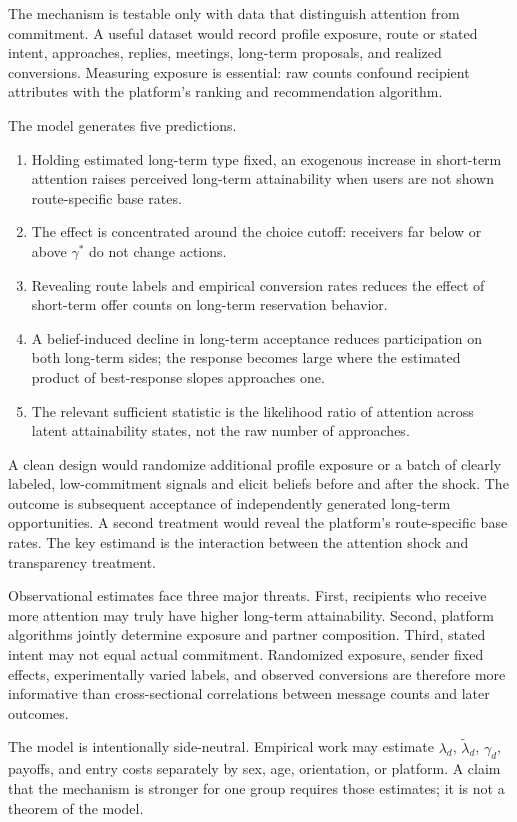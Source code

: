 \documentclass[11pt]{article}
\begin{document}
The mechanism is testable only with data that distinguish attention from
commitment. A useful dataset would record profile exposure, route or stated
intent, approaches, replies, meetings, long-term proposals, and realized
conversions. Measuring exposure is essential: raw counts confound recipient
attributes with the platform's ranking and recommendation algorithm.

The model generates five predictions.
\begin{enumerate}[leftmargin=*]
\item Holding estimated long-term type fixed, an exogenous increase in
short-term attention raises perceived long-term attainability when users are not
shown route-specific base rates.
\item The effect is concentrated around the choice cutoff: receivers far below
or above $\gamma^*$ do not change actions.
\item Revealing route labels and empirical conversion rates reduces the effect
of short-term offer counts on long-term reservation behavior.
\item A belief-induced decline in long-term acceptance reduces participation on
both long-term sides; the response becomes large where the estimated product of
best-response slopes approaches one.
\item The relevant sufficient statistic is the likelihood ratio of attention
across latent attainability states, not the raw number of approaches.
\end{enumerate}

A clean design would randomize additional profile exposure or a batch of
clearly labeled, low-commitment signals and elicit beliefs before and after the
shock. The outcome is subsequent acceptance of independently generated
long-term opportunities. A second treatment would reveal the platform's
route-specific base rates. The key estimand is the interaction between the
attention shock and transparency treatment.

Observational estimates face three major threats. First, recipients who receive
more attention may truly have higher long-term attainability. Second, platform
algorithms jointly determine exposure and partner composition. Third, stated
intent may not equal actual commitment. Randomized exposure, sender fixed
effects, experimentally varied labels, and observed conversions are therefore
more informative than cross-sectional correlations between message counts and
later outcomes.

The model is intentionally side-neutral. Empirical work may estimate
$\lambda_d$, $\widetilde\lambda_d$, $\gamma_d$, payoffs, and entry costs
separately by sex, age, orientation, or platform. A claim that the mechanism is
stronger for one group requires those estimates; it is not a theorem of the
model.
\end{document}
